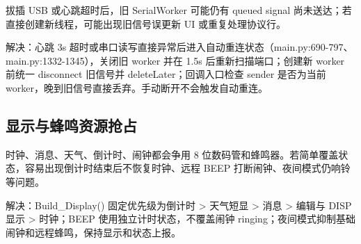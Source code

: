 \documentclass[11pt,a4paper]{article}
\begin{document}
拔插 USB 或心跳超时后，旧 SerialWorker 可能仍有 queued signal 尚未送达；若直接创建新线程，可能出现旧信号误更新 UI 或重复处理协议行。

解决：心跳 3s 超时或串口读写直接异常后进入自动重连状态（main.py:690-797、main.py:1332-1345），关闭旧 worker 并在 1.5s 后重新扫描端口；创建新 worker 前统一 disconnect 旧信号并 deleteLater；回调入口检查 sender 是否为当前 worker，晚到旧信号直接丢弃。手动断开不会触发自动重连。

\subsection{显示与蜂鸣资源抢占}

时钟、消息、天气、倒计时、闹钟都会争用 8 位数码管和蜂鸣器。若简单覆盖状态，容易出现倒计时结束后不恢复时钟、远程 BEEP 打断闹钟、夜间模式仍响铃等问题。

解决：Build\_Display() 固定优先级为倒计时 > 天气短显 > 消息 > 编辑与 DISP 显示 > 时钟；BEEP 使用独立计时状态，不覆盖闹钟 ringing；夜间模式抑制基础闹钟和远程蜂鸣，保持显示和状态上报。

\end{document}
